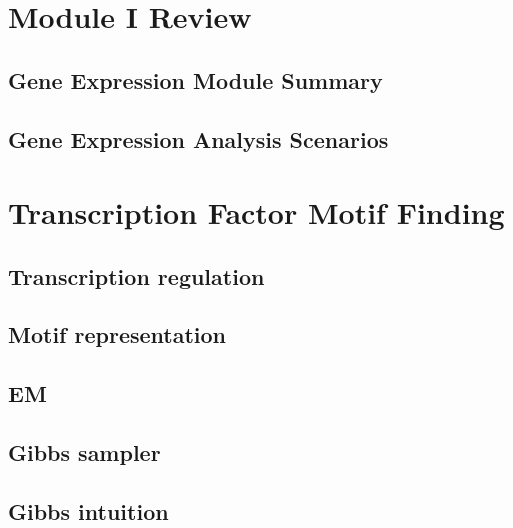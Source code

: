 \documentclass[
]{book}
\begin{document}
\hypertarget{m1re}{%
\chapter{Module I Review}\label{m1re}}

\hypertarget{gene-expression-module-summary}{%
\section{Gene Expression Module Summary}\label{gene-expression-module-summary}}

\hypertarget{gene-expression-analysis-scenarios}{%
\section{Gene Expression Analysis Scenarios}\label{gene-expression-analysis-scenarios}}

\hypertarget{tfmf}{%
\chapter{Transcription Factor Motif Finding}\label{tfmf}}

\hypertarget{transcription-regulation}{%
\section{Transcription regulation}\label{transcription-regulation}}

\hypertarget{motif-representation}{%
\section{Motif representation}\label{motif-representation}}

\hypertarget{em}{%
\section{EM}\label{em}}

\hypertarget{gibbs-sampler}{%
\section{Gibbs sampler}\label{gibbs-sampler}}

\hypertarget{gibbs-intuition}{%
\section{Gibbs intuition}\label{gibbs-intuition}}
\end{document}
